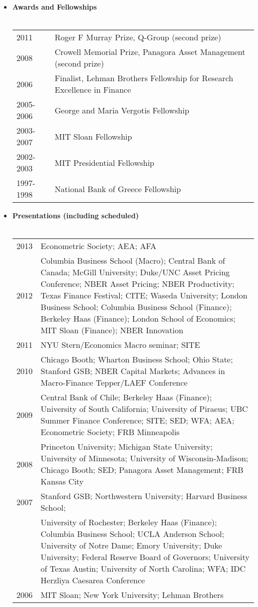 \documentclass[11pt,letterpaper,overlapped]{res}
\begin{document}
\begin{resume}
\begin{itemize}
\item \textbf{Awards and Fellowships}\\ \\
\begin{tabular}{ll}
2011 & Roger F Murray Prize, Q-Group (second prize)\\
2008 & Crowell Memorial Prize, Panagora Asset Management (second prize)\\
2006  & Finalist, Lehman Brothers Fellowship for Research Excellence in Finance\\
2005-2006 & George and Maria Vergotis Fellowship\\
2003-2007 & MIT Sloan Fellowship\\
2002-2003 & MIT Presidential Fellowship\\
1997-1998 & National Bank of Greece Fellowship \\
\end{tabular}
\newpage
\vspace{0.5cm}
\item \textbf{Presentations (including scheduled)} \\ \\
\begin{tabular}{lp{12cm}}
2013 & Econometric Society; AEA; AFA\\[0.2cm]
2012 & Columbia Business School (Macro); Central Bank of Canada; McGill University; Duke/UNC Asset Pricing Conference; NBER Asset Pricing; NBER Productivity; Texas Finance Festival; CITE; Waseda University; London Business School; Columbia Business School (Finance); Berkeley Haas (Finance);  London School of Economics; MIT Sloan (Finance); NBER Innovation\\[0.2cm]
2011 & NYU Stern/Economics Macro seminar; SITE \\[0.2cm]
2010 & Chicago Booth; Wharton Business School; Ohio State; Stanford GSB;  NBER Capital Markets; Advances in Macro-Finance Tepper/LAEF Conference\\[0.2cm]
2009 & Central Bank of Chile; Berkeley Haas (Finance); University of South California;   University of Piraeus; UBC Summer Finance Conference; SITE;   SED; WFA; AEA; Econometric Society; FRB Minneapolis\\[0.2cm]
2008 & Princeton University; Michigan State University; University of Minnesota;    University of Wisconsin-Madison; Chicago Booth; SED;   Panagora Asset Management; FRB Kansas City\\[0.2cm]
2007 & Stanford GSB; Northwestern University; Harvard Business School; \\ &  University of Rochester; Berkeley Haas (Finance); Columbia Business School;  UCLA Anderson School; University of Notre Dame;    Emory University; Duke University; Federal Reserve Board of Governors;  University of Texas Austin; University of North Carolina;  WFA; IDC Herzliya Caesarea Conference\\[0.2cm]
2006 & MIT Sloan; New York University; Lehman Brothers\\
\end{tabular}
 \vspace{0.5cm}


\end{itemize}
\end{resume}
\end{document}
